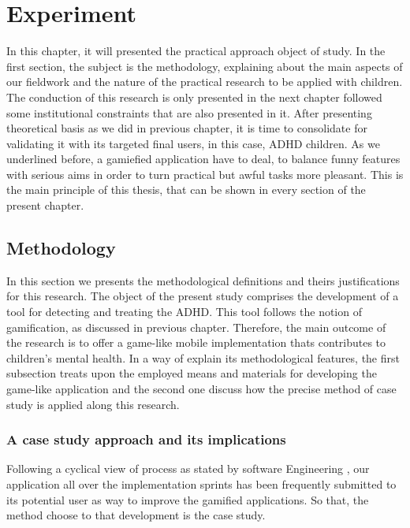 \chapter{Experiment}
\label{ch:caseStudy}

In this chapter, it will presented the practical approach object of study. In the first section, the subject is the methodology, explaining about the main aspects of our fieldwork and the nature of the practical research to be applied with children. The conduction of this research is only presented in the next chapter followed some institutional constraints that are also presented in it.  After presenting theoretical basis as we did in previous chapter, it is time to consolidate for validating it with its targeted final users, in this case, ADHD children. As we underlined before, a gamiefied application have to deal, to balance funny features with serious aims in order to turn practical but awful tasks more pleasant. This is the main principle of this thesis, that can be shown in every section of the present chapter.


\section{Methodology}

In this section we presents the methodological definitions and theirs justifications for this research. The object of the present study comprises the development of a tool for detecting and treating the ADHD. This tool follows the notion of gamification, as discussed in previous chapter. Therefore, the main outcome of the research is to offer a game-like mobile implementation thats contributes to children's mental health. In a way of explain its methodological features, the first subsection treats upon the employed means and materials for developing the game-like application and the second one discuss how the precise method of case study is applied along this research.

\subsection{A case study approach and its implications}

Following a cyclical view of process as stated by software Engineering \citep{pressman}, our application all over the implementation sprints has been frequently submitted to its potential user as way to improve the gamified applications. So that, the method choose to that development is the case study.

